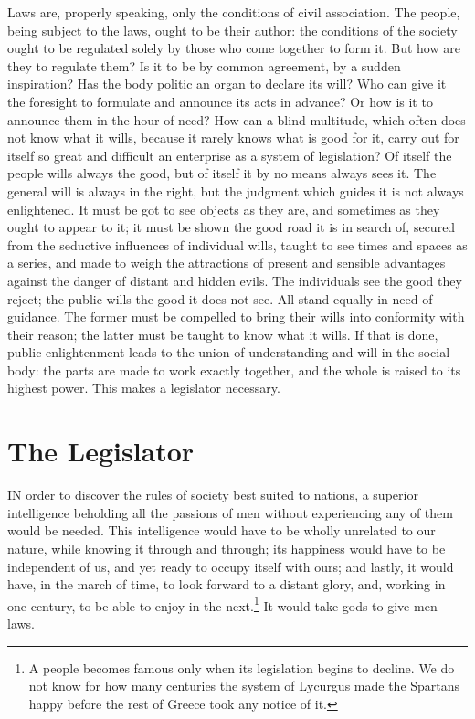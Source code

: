 \documentclass[12pt]{book}
\begin{document}
Laws are, properly speaking, only the conditions of civil association. The people, being subject to the laws, ought to be their author: the conditions of the society ought to be regulated solely by those who come together to form it. But how are they to regulate them? Is it to be by common agreement, by a sudden inspiration? Has the body politic an organ to declare its will? Who can give it the foresight to formulate and announce its acts in advance? Or how is it to announce them in the hour of need? How can a blind multitude, which often does not know what it wills, because it rarely knows what is good for it, carry out for itself so great and difficult an enterprise as a system of legislation? Of itself the people wills always the good, but of itself it by no means always sees it. The general will is always in the right, but the judgment which guides it is not always enlightened. It must be got to see objects as they are, and sometimes as they ought to appear to it; it must be shown the good road it is in search of, secured from the seductive influences of individual wills, taught to see times and spaces as a series, and made to weigh the attractions of present and sensible advantages against the danger of distant and hidden evils. The individuals see the good they reject; the public wills the good it does not see. All stand equally in need of guidance. The former must be compelled to bring their wills into conformity with their reason; the latter must be taught to know what it wills. If that is done, public enlightenment leads to the union of understanding and will in the social body: the parts are made to work exactly together, and the whole is raised to its highest power. This makes a legislator necessary.

\section{The Legislator}
IN order to discover the rules of society best suited to nations, a superior intelligence beholding all the passions of men without experiencing any of them would be needed. This intelligence would have to be wholly unrelated to our nature, while knowing it through and through; its happiness would have to be independent of us, and yet ready to occupy itself with ours; and lastly, it would have, in the march of time, to look forward to a distant glory, and, working in one century, to be able to enjoy in the next.\footnote{A people becomes famous only when its legislation begins to decline. We do not know for how many centuries the system of Lycurgus made the Spartans happy before the rest of Greece took any notice of it.} It would take gods to give men laws.
\end{document}
